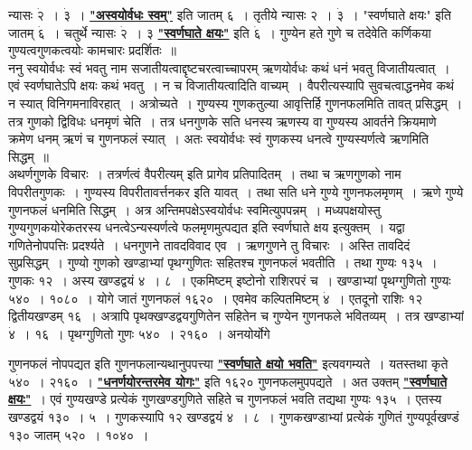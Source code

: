 \documentclass[11pt, openany]{book}
\begin{document}
\noindent न्यासः $\dot{\text{२}}$~। $\dot{\text{३}}$~। \hyperref[1.4.1]{\textbf{"अस्वयोर्वधः स्वम्"}} इति जातम् ६~। तृतीये न्यासः २~। $\dot{\text{३}}$~। {\qt "स्वर्णघाते क्षयः"} इति जातम् $\dot{\text{६}}$~। चतुर्थे न्यासः $\dot{\text{२}}$~। ३ \hyperref[1.4.1]{\textbf{"स्वर्णघाते क्षयः"}} इति $\dot{\text{६}}$~। गुण्येन हते गुणे च तदेवेति कर्णिकया गुण्यत्वगुणकत्वयोः कामचारः प्रदर्शितः~॥ \\

\vspace{-3mm}
 ननु स्वयोर्वधः स्वं भवतु नाम सजातीयत्वाद्दृष्टचरत्वाच्चापरम् ऋणयोर्वधः 
कथं धनं भवतु विजातीयत्वात्~। एवं स्वर्णघातेऽपि क्षयः कथं 
भवतु~। न च विजातीयत्वादिति वाच्यम्~। वैपरीत्यस्यापि सुवचत्वाद्धनमेव 
कथं न स्यात् विनिगमनाविरहात्~। अत्रोच्यते~। गुण्यस्य गुणकतुल्या 
आवृत्तिर्हि गुणनफलमिति तावत् प्रसिद्धम्~। तत्र गुणको द्विविधः \;धनमृणं 
चेति~। तत्र \;धनगुणके सति \;धनस्य ऋणस्य वा \;गुण्यस्य आवर्तने 
क्रियमाणे क्रमेण धनम् ऋणं च गुणनफलं स्यात्~। अतः स्वयोर्वधः 
स्वं गुणकस्य धनत्वे गुण्यस्यर्णत्वे ऋणमिति सिद्धम्~॥ \\

\vspace{-3mm}
 अथर्णगुणके विचारः~। तत्रर्णत्वं वैपरीत्यम् इति प्रागेव प्रतिपादितम्~। 
तथा च ऋणगुणको नाम विपरीतगुणकः~। गुण्यस्य विपरीतावर्त्तनकर इति 
यावत्~। तथा सति धने गुण्ये गुणनफलमृणम्~। ऋणे गुण्ये गुणनफलं धनमिति सिद्धम्~। अत्र अन्तिमपक्षेऽस्वयोर्वधः स्वमित्युपपन्नम्~। 
मध्यपक्षयोस्तु गुण्यगुणकयोरेकतरस्य धनत्वेऽन्यस्यर्णत्वे फलमृणमुत्पद्यत
इति स्वर्णघाते क्षय इत्युक्तम्~। यद्वा गणितेनोपपत्तिः प्रदर्श्यते~। धनगुणने
तावदविवाद एव~। ऋणगुणने तु विचारः~। अस्ति तावदिदं सुप्रसिद्धम्~। 
गुण्यो गुणको खण्डाभ्यां पृथग्गुणितः सहितश्च गुणनफलं भवतीति~। 
तथा गुण्यः १३५~। गुणकः १२~। अस्य खण्डद्वयं ४~। ८~। एकमिष्टम् इष्टोनो 
राशिरपरं च~। खण्डाभ्यां पृथग्गुणितो गुण्यः ५४०~। १०८०~। योगे जातं 
गुणनफलं १६२०~। एवमेव कल्पितमिष्टम् $\dot{\text{४}}$~। एतदूनो राशिः १२ द्वितीयखण्डम् १६~। अत्रापि पृथक्खण्डद्वयगुणितेन सहितेन च गुण्येन गुणनफले भवितव्यम्~। तत्र खण्डाभ्यां $\dot{\text{४}}$~। १६~। पृथग्गुणितो गुणः ५४०~। २१६०~। अनयोर्योगे
\newpage

\noindent गुणनफलं नोपपद्यत इति गुणनफलान्यथानुपपत्त्या \hyperref[1.4.1]{\textbf{"स्वर्णघाते क्षयो भवति"}} इत्यवगम्यते~। यतस्तथा कृते $\dot{\text{५४०}}$~। २१६०~। \hyperref[1.3.1]{\textbf{"धनर्णयोरन्तरमेव योगः"}} इति १६२० गुणनफलमुपपद्यते~। अत उक्तम् \hyperref[1.4.1]{\textbf{"स्वर्णघाते क्षयः"}}~। एवं गुण्यखण्डे प्रत्येकं गुणखण्डगुणिते सहिते च गुणनफलं भवति तद्यथा गुण्यः १३५~। एतस्य खण्डद्वयं १३०~। ५~। गुणकस्यापि १२ खण्डद्वयं ४~। ८~। गुणकखण्डाभ्यां प्रत्येकं गुणितं गुण्यपूर्वखण्डं १३० जातम् ५२०~। १०४०~। \\
\end{document}
